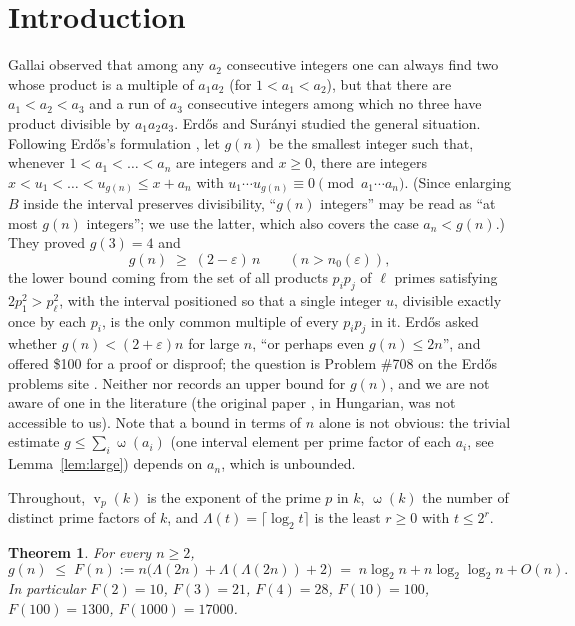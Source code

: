 \documentclass[11pt]{article}
\newtheorem{theorem}{Theorem}[section]
\theoremstyle{definition}
\newcommand{\Lam}{\Lambda}
\DeclareMathOperator{\vp}{v}
\DeclareMathOperator{\om}{\omega}
\begin{document}
\section{Introduction}

Gallai observed that among any $a_2$ consecutive integers one can always find two whose product is a
multiple of $a_1a_2$ (for $1<a_1<a_2$), but that there are $a_1<a_2<a_3$ and a run of $a_3$ consecutive
integers among which no three have product divisible by $a_1a_2a_3$. Erd\H{o}s and Sur\'anyi
\cite{ES59} studied the general situation. Following Erd\H{o}s's formulation \cite[\S1]{Er92}, let $g(n)$ be
the smallest integer such that, whenever $1<a_1<\dots<a_n$ are integers and $x\ge 0$, there are integers
$x<u_1<\dots<u_{g(n)}\le x+a_n$ with $u_1\cdots u_{g(n)}\equiv 0 \pmod{a_1\cdots a_n}$. (Since enlarging $B$ inside the interval preserves divisibility, ``$g(n)$ integers'' may be read as ``at most
$g(n)$ integers''; we use the latter, which also covers the case $a_n<g(n)$.) They proved
$g(3)=4$ and
\begin{equation}\label{eq:ES}
 g(n)\;\ge\;(2-\varepsilon)\,n\qquad(n>n_0(\varepsilon)),
\end{equation}
the lower bound coming from the set of all products $p_ip_j$ of $\ell$ primes satisfying $2p_1^2>p_\ell^2$,
with the interval positioned so that a single integer $u$, divisible exactly once by each $p_i$, is the only
common multiple of every $p_ip_j$ in it. Erd\H{o}s \cite{Er92} asked whether $g(n)<(2+\varepsilon)n$ for
large $n$, ``or perhaps even $g(n)\le 2n$'', and offered \$100 for a proof or disproof; the question is
Problem \#708 on the Erd\H{o}s problems site \cite{EP708}. Neither \cite{Er92} nor \cite{EP708} records
an upper bound for $g(n)$, and we are not aware of one in the literature (the original paper \cite{ES59},
in Hungarian, was not accessible to us). Note that a bound in terms of $n$ alone is not obvious: the trivial
estimate $g\le\sum_i\om(a_i)$ (one interval element per prime factor of each $a_i$, see
Lemma~\ref{lem:large}) depends on $a_n$, which is unbounded.

Throughout, $\vp_p(k)$ is the exponent of the prime $p$ in $k$, $\om(k)$ the number of distinct prime factors
of $k$, and $\Lam(t)=\lceil\log_2 t\rceil$ is the least $r\ge 0$ with $t\le 2^r$.

\begin{theorem}\label{thm:log}
For every $n\ge 2$,
\[
 g(n)\;\le\;F(n):=n\bigl(\Lam(2n)+\Lam(\Lam(2n))+2\bigr)\;=\;n\log_2 n+n\log_2\log_2 n+O(n).
\]
In particular $F(2)=10$, $F(3)=21$, $F(4)=28$, $F(10)=100$, $F(100)=1300$, $F(1000)=17000$.
\end{theorem}
\end{document}
